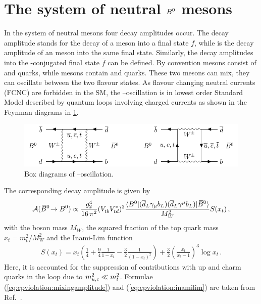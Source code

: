
\section{The system of neutral \texorpdfstring{${{B}^0}$}{B0} mesons}
\label{sec:cpviolation:neutralBmesons}

In the system of neutral \Bd mesons four decay amplitudes occur. The decay
amplitude \Af stands for the decay of a \Bd meson into a final state $f$, while
\Abarf is the decay amplitude of an \Bdb meson into the same final state.
Similarly, the decay amplitudes into the \CP-conjugated final state $\bar{f}$
can be defined. By convention \Bd mesons consist of \bquarkbar and \dquark
quarks, while \Bdb mesons contain \bquark and \dquarkbar quarks. These two
mesons can mix, \ie they can oscillate between the two flavour states. As
flavour changing neutral currents (FCNC) are forbidden in the SM, the
\Bd--\Bdb oscillation is in lowest order Standard Model described by quantum
loops involving charged currents as shown in the Feynman diagrams in
\cref{fig:cpviolation:neutralBmesons:boxdiagram}.
\begin{figure}[htb]
\centering
\includegraphics[width=\textwidth]{03-CPViolation/tikz/pdf/Boxdiagrams.pdf}
\caption{Box diagrams of \Bd--\Bdb oscillation.}
\label{fig:cpviolation:neutralBmesons:boxdiagram}
\end{figure}
The corresponding decay amplitude is given by
\begin{align}
	\mathcal{A}({{\kern 0.18em\overline{\kern -0.18em B}{}}{}^0}\!\rightarrow{\ensuremath{{B}^0}}) \propto \frac{g_2^4}{16\,\pi^2}({V_{{t}{b}}^{}}{V_{{t}{d}}^\ast})^2 \frac{\langle {\ensuremath{{B}^0}}|({\overline {{d}}}_L\gamma_\mu{\ensuremath{b}}_L)({\overline {{d}}}_L\gamma^\mu{\ensuremath{b}}_L)|{{\kern 0.18em\overline{\kern -0.18em B}{}}{}^0}\rangle}{M_W^2}S(x_t)\,,
\label{eq:cpviolation:mixingamplitude}
\end{align}
with the \W boson mass $M_W$, the squared fraction of the top quark mass $x_t
= m_t^2/M_W^2$ and the Inami-Lim function~\cite{Inami:1980fz}
\begin{align}
	S(x_t) = x_t \left(\frac 14 + \frac 94 \frac{1}{1 - x_t} - \frac 32 \frac{1}{(1 - x_t)^2}\right) + \frac 32 \left(\frac{x_t}{x_t - 1}\right)^3 \log x_t\,.
\label{eq:cpviolation:inamilim}
\end{align}
Here, it is accounted for the suppression of contributions with up and charm
quarks in the loop due to $m_{{u},{c}}^2 \ll m_{{t}}^2$. Formulae
(\ref{eq:cpviolation:mixingamplitude}) and (\ref{eq:cpviolation:inamilim}) are
taken from Ref.~\cite{Brock:2011zz}.

